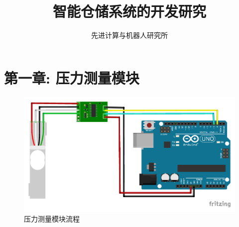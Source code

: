 \documentclass{article}
\newcommand{\xiaosihao}{\fontsize{12pt}{\baselineskip}\selectfont}
\begin{document}
	
\newtheorem{example}{例}             %
\newtheorem{algorithm}{算法}
\newtheorem{theorem}{定理}[section]  %
\newtheorem{definition}{定义}
\newtheorem{axiom}{公理}
\newtheorem{property}{性质}
\newtheorem{proposition}{命题}
\newtheorem{lemma}{引理}
\newtheorem{corollary}{推论}
\newtheorem{remark}{注解}
\newtheorem{condition}{条件}
\newtheorem{conclusion}{结论}
\newtheorem{assumption}{假设}

\renewcommand{\contentsname}{目录}  %
\renewcommand{\abstractname}{摘要}  %
\renewcommand{\refname}{参考文献}   %
\renewcommand{\indexname}{索引}
\renewcommand{\figurename}{图}
\renewcommand{\tablename}{表}
\renewcommand{\appendixname}{附录}
\renewcommand{\algorithm}{算法}	

\title{智能仓储系统的开发研究}
\author{\xiaosihao 先进计算与机器人研究所}
		
\maketitle
		
\tableofcontents
\newpage

\section{第一章: 压力测量模块}
\begin{figure}[h]
	\centering
	\includegraphics[width=\linewidth]{../Picture/PressureSensor.pdf}
	\caption{压力测量模块流程}
	\label{fig:压力测量模块流程图}
	\hfill
\end{figure}
		
\end{document}
